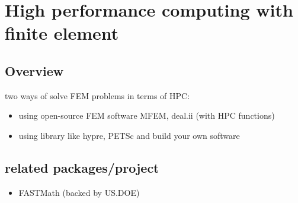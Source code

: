 \section{High performance computing with finite element } 
\subsection{Overview}
two ways of solve FEM problems in terms of HPC:
\begin{itemize}
	\item using open-source FEM software MFEM\cite{mfem-library}, deal.ii\cite{Arndt-2007-} (with HPC functions) 
	\item using library like hypre, PETSc and build your own software
\end{itemize} 
\subsection{related packages/project}
\begin{itemize}
	\item FASTMath (backed by US.DOE)
\end{itemize}

